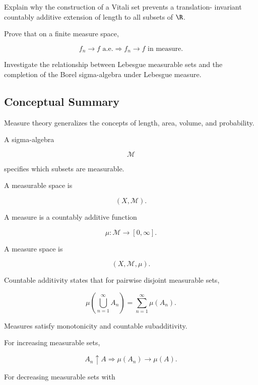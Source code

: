 \begin{exercise}[4]
Explain why the construction of a Vitali set prevents a translation-
invariant countably additive extension of length to all subsets of
\(\R\).
\end{exercise}

\begin{exercise}[4]
Prove that on a finite measure space,

\[
f_n\to f
\text{ a.e.}
\Longrightarrow
f_n\to f
\text{ in measure}.
\]
\end{exercise}

\begin{exercise}[4]
Investigate the relationship between Lebesgue measurable sets and the
completion of the Borel sigma-algebra under Lebesgue measure.
\end{exercise}

\subsection{Conceptual Summary}
\label{subsec:measure-theory-summary}

Measure theory generalizes the concepts of length, area, volume, and
probability.

A sigma-algebra

\[
\boxed{
\mathcal{M}
}
\]

specifies which subsets are measurable.

A measurable space is

\[
\boxed{
(X,\mathcal{M}).
}
\]

A measure is a countably additive function

\[
\boxed{
\mu:\mathcal{M}\to[0,\infty].
}
\]

A measure space is

\[
\boxed{
(X,\mathcal{M},\mu).
}
\]

Countable additivity states that for pairwise disjoint measurable sets,

\[
\boxed{
\mu\left(
\bigcup_{n=1}^{\infty}A_n
\right)
=
\sum_{n=1}^{\infty}\mu(A_n).
}
\]

Measures satisfy monotonicity and countable subadditivity.

For increasing measurable sets,

\[
\boxed{
A_n\uparrow A
\Longrightarrow
\mu(A_n)\to\mu(A).
}
\]

For decreasing measurable sets with

